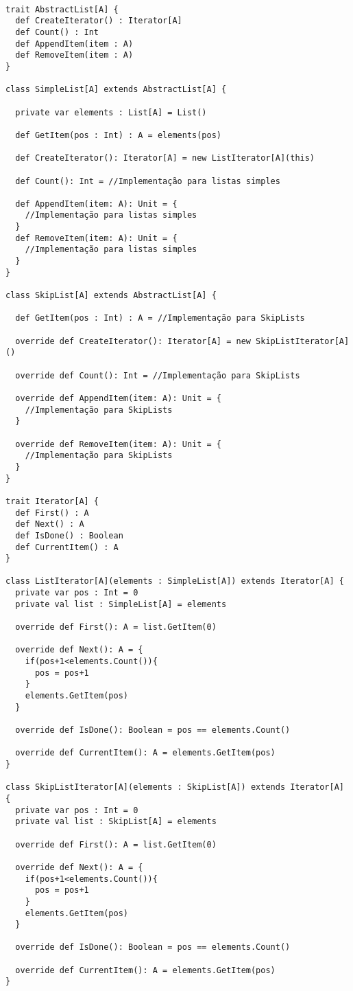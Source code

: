 \begin{lstlisting}[caption={Iterator Orientação a Objetos},label=ooiterator]

trait AbstractList[A] {
  def CreateIterator() : Iterator[A]
  def Count() : Int
  def AppendItem(item : A)
  def RemoveItem(item : A)
}

class SimpleList[A] extends AbstractList[A] {

  private var elements : List[A] = List()

  def GetItem(pos : Int) : A = elements(pos)

  def CreateIterator(): Iterator[A] = new ListIterator[A](this)

  def Count(): Int = //Implementação para listas simples

  def AppendItem(item: A): Unit = {
    //Implementação para listas simples
  }
  def RemoveItem(item: A): Unit = {
    //Implementação para listas simples
  }
}

class SkipList[A] extends AbstractList[A] {

  def GetItem(pos : Int) : A = //Implementação para SkipLists

  override def CreateIterator(): Iterator[A] = new SkipListIterator[A]()

  override def Count(): Int = //Implementação para SkipLists

  override def AppendItem(item: A): Unit = {
    //Implementação para SkipLists
  }

  override def RemoveItem(item: A): Unit = {
    //Implementação para SkipLists
  }
}

trait Iterator[A] {
  def First() : A
  def Next() : A
  def IsDone() : Boolean
  def CurrentItem() : A
}

class ListIterator[A](elements : SimpleList[A]) extends Iterator[A] {
  private var pos : Int = 0
  private val list : SimpleList[A] = elements

  override def First(): A = list.GetItem(0)

  override def Next(): A = {
    if(pos+1<elements.Count()){
      pos = pos+1
    }
    elements.GetItem(pos)
  }

  override def IsDone(): Boolean = pos == elements.Count()

  override def CurrentItem(): A = elements.GetItem(pos)
}

class SkipListIterator[A](elements : SkipList[A]) extends Iterator[A] {
  private var pos : Int = 0
  private val list : SkipList[A] = elements

  override def First(): A = list.GetItem(0)

  override def Next(): A = {
    if(pos+1<elements.Count()){
      pos = pos+1
    }
    elements.GetItem(pos)
  }

  override def IsDone(): Boolean = pos == elements.Count()

  override def CurrentItem(): A = elements.GetItem(pos)
}
    
\end{lstlisting}

